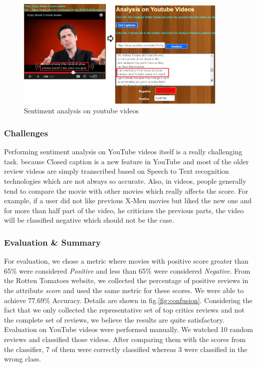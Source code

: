 \begin{figure}[H]
    \centering
    \includegraphics[width=4.0in]{youtube.png}
    \caption{Sentiment analysis on youtube videos}
    \label{fig:youtube}
    \end{figure}

\subsubsection{Challenges}
Performing sentiment analysis on YouTube videos itself is a really challenging task. because Closed caption is a new feature in YouTube and most of the older review videos are simply transcribed based on Speech to Text recognition technologies which are not always so accurate. Also, in videos, people generally tend to compare the movie with other movies which really affects the score. For example, if a user did not like previous X-Men movies but liked the new one and for more than half part of the video, he criticizes the previous parts, the video will be classified negative which should not be the case.

\subsubsection{Evaluation \& Summary}
For evaluation, we chose a metric where movies with positive score greater than 65\% were considered \textit{Positive} and less than 65\% were considered \textit{Negative}. From the Rotten Tomatoes website, we collected the percentage of positive reviews in the attribute \textit{score } and used the same metric for these scores. We were able to achieve 77.69\% Accuracy. Details are shown in fig.\ref{fig:confusion}. Considering the fact that we only collected the representative set of top critics reviews and not the complete set of reviews, we believe the results are quite satisfactory. Evaluation on YouTube videos were performed manually. We watched 10 random reviews and classified those videos. After comparing them with the scores from the classifier, 7 of them were correctly classified whereas 3 were classified in the wrong class.  
 
